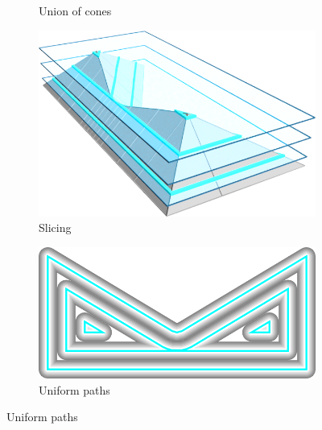 \begin{figure}
\begin{subfigure}{\figwidthTwo}
\caption{Union of cones}\label{overview_uoc}
\end{subfigure}
\begin{subfigure}{\figwidthTwo}\centering
\hspace*{\tempheightTwo}
\includegraphics[height=\figheight]{sources/method/overview/surface/sliced_naive_cropped.png}
\caption{Slicing}\label{overview_uniform_sliced}
\end{subfigure}
\begin{subfigure}{\figwidth}\centering
\includegraphics[width=\figheight,rotate=-90]{sources/method/overview/2D/naive.png}
\caption{Uniform paths}\label{overview_uniform_paths}
\end{subfigure}



\end{figure}
